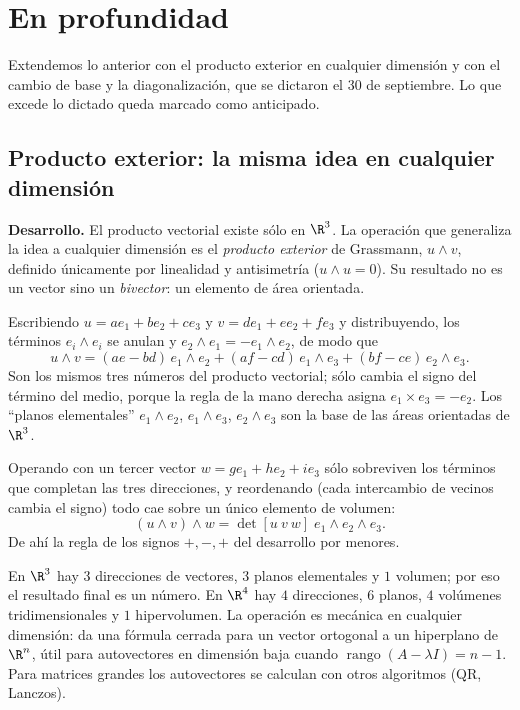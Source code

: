 \section{En profundidad}

Extendemos lo anterior con el producto exterior en cualquier dimensión y con el cambio de base y la diagonalización, que se dictaron el 30 de septiembre. Lo que excede lo dictado queda marcado como anticipado.

\subsection{Producto exterior: la misma idea en cualquier dimensión}\label{sec:exterior}

\textbf{Desarrollo.} El producto vectorial existe sólo en \(\R^3\). La operación que
generaliza la idea a cualquier dimensión es el \emph{producto exterior} de Grassmann,
\(u\wedge v\), definido únicamente por linealidad y antisimetría (\(u\wedge u=0\)). Su
resultado no es un vector sino un \emph{bivector}: un elemento de área orientada.

Escribiendo \(u=ae_1+be_2+ce_3\) y \(v=de_1+ee_2+fe_3\) y distribuyendo, los términos
\(e_i\wedge e_i\) se anulan y \(e_2\wedge e_1=-e_1\wedge e_2\), de modo que
\[
  u\wedge v=(ae-bd)\,e_1\wedge e_2+(af-cd)\,e_1\wedge e_3+(bf-ce)\,e_2\wedge e_3 .
\]
Son los mismos tres números del producto vectorial; sólo cambia el signo del término del
medio, porque la regla de la mano derecha asigna \(e_1\times e_3=-e_2\). Los ``planos
elementales'' \(e_1\wedge e_2\), \(e_1\wedge e_3\), \(e_2\wedge e_3\) son la base de las
áreas orientadas de \(\R^3\).

Operando con un tercer vector \(w=ge_1+he_2+ie_3\) sólo sobreviven los términos que completan
las tres direcciones, y reordenando (cada intercambio de vecinos cambia el signo) todo cae
sobre un único elemento de volumen:
\[
  (u\wedge v)\wedge w=\det[u\ v\ w]\;e_1\wedge e_2\wedge e_3 .
\]
De ahí la regla de los signos \(+,-,+\) del desarrollo por menores.

\begin{idea}
En \(\R^3\) hay \(3\) direcciones de vectores, \(3\) planos elementales y \(1\) volumen; por
eso el resultado final es un número. En \(\R^4\) hay \(4\) direcciones, \(6\) planos, \(4\)
volúmenes tridimensionales y \(1\) hipervolumen. La operación es mecánica en cualquier
dimensión: da una fórmula cerrada para un vector ortogonal a un hiperplano de \(\R^n\), útil
para autovectores en dimensión baja cuando \(\operatorname{rango}(A-\lambda I)=n-1\). Para
matrices grandes los autovectores se calculan con otros algoritmos (QR, Lanczos).
\end{idea}

